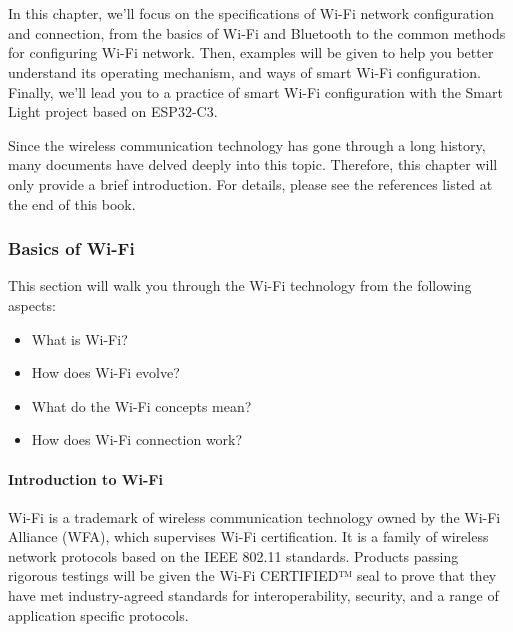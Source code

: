 \documentclass[a4paper,12pt]{book}
\begin{document}

{\makeatletter
\let\ps@plain\ps@empty
\makeatother
\part[Wireless Communication and Control]{}
}

\chapter[Wi-Fi Configuration and Connection]{}

\vspace{36pt}
In this chapter, we’ll focus on the specifications of Wi-Fi network configuration and connection, from the basics of Wi-Fi and Bluetooth to the common methods for configuring Wi-Fi network. Then, examples will be given to help you better understand its operating mechanism, and ways of smart Wi-Fi configuration. Finally, we’ll lead you to a practice of smart Wi-Fi configuration with the Smart Light project based on ESP32-C3.

Since the wireless communication technology has gone through a long history, many documents have delved deeply into this topic. Therefore, this chapter will only provide a brief introduction. For details, please see the references listed at the end of this book.

\section{Basics of Wi-Fi}
This section will walk you through the Wi-Fi technology from the following aspects:

\begin{itemize}
    \item What is Wi-Fi?
    \item How does Wi-Fi evolve?
    \item What do the Wi-Fi concepts mean? 
    \item How does Wi-Fi connection work?
\end{itemize}

\subsection{Introduction to Wi-Fi}
Wi-Fi is a trademark of wireless communication technology owned by the Wi-Fi Alliance (WFA), which supervises Wi-Fi certification. It is a family of wireless network protocols based on the IEEE 802.11 standards. Products passing rigorous testings will be given the Wi-Fi CERTIFIED™ seal to prove that they have met industry-agreed standards for interoperability, security, and a range of application specific protocols.
\end{document}
